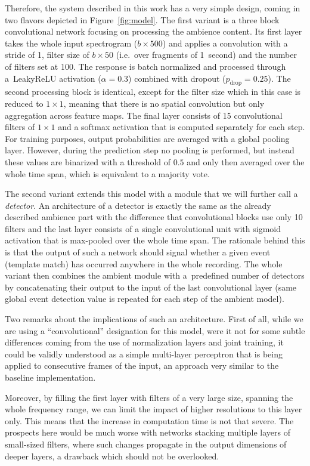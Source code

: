 \documentclass{article}
\begin{document}
\begin{sloppy}
Therefore, the system described in this work has a very simple design, coming in two flavors depicted in Figure~\ref{fig:model}. The first variant is a three block convolutional network focusing on processing the ambience content. Its first layer takes the whole input spectrogram ($b \times 500$) and applies a convolution with a stride of 1, filter size of $b \times 50$ (i.e.~over fragments of 1~second) and the number of filters set at 100. The response is batch normalized and processed through a~LeakyReLU activation ($\alpha = 0.3$) combined with dropout (\mbox{$p_\textrm{drop} = 0.25$}). The second processing block is identical, except for the filter size which in this case is reduced to $1 \times 1$, meaning that there is no spatial convolution but only aggregation across feature maps. The final layer consists of 15 convolutional filters of $1 \times 1$ and a softmax activation that is computed separately for each step. For training purposes, output probabilities are averaged with a global pooling layer. However, during the prediction step no pooling is performed, but instead these values are binarized with a threshold of $0.5$ and only then averaged over the whole time span, which is equivalent to a majority vote.

The second variant extends this model with a module that we will further call a \textit{detector}. An architecture of a detector is exactly the same as the already described ambience part with the difference that convolutional blocks use only 10 filters and the last layer consists of a single convolutional unit with sigmoid activation that is max-pooled over the whole time span. The rationale behind this is that the output of such a network should signal whether a given event (template match) has occurred anywhere in the whole recording. The whole variant then combines the ambient module with a~predefined number of detectors by concatenating their output to the input of the last convolutional layer (same global event detection value is repeated for each step of the ambient model).

Two remarks about the implications of such an architecture. First of all, while we are using a \enquote{convolutional} designation for this model, were it not for some subtle differences coming from the use of normalization layers and joint training, it could be validly understood as a simple multi-layer perceptron that is being applied to consecutive frames of the input, an approach very similar to the baseline implementation.

Moreover, by filling the first layer with filters of a very large size, spanning the whole frequency range, we can limit the impact of higher resolutions to this layer only. This means that the increase in computation time is not that severe. The prospects here would be much worse with networks stacking multiple layers of small-sized filters, where such changes propagate in the output dimensions of deeper layers, a drawback which should not be overlooked.


\end{sloppy}
\end{document}

